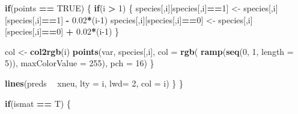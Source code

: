 \documentclass[]{article}
\newenvironment{Shaded}{\begin{snugshade}}{\end{snugshade}}
\newcommand{\ControlFlowTok}[1]{\textcolor[rgb]{0.13,0.29,0.53}{\textbf{#1}}}
\newcommand{\DataTypeTok}[1]{\textcolor[rgb]{0.13,0.29,0.53}{#1}}
\newcommand{\DecValTok}[1]{\textcolor[rgb]{0.00,0.00,0.81}{#1}}
\newcommand{\FloatTok}[1]{\textcolor[rgb]{0.00,0.00,0.81}{#1}}
\newcommand{\KeywordTok}[1]{\textcolor[rgb]{0.13,0.29,0.53}{\textbf{#1}}}
\newcommand{\NormalTok}[1]{#1}
\newcommand{\OperatorTok}[1]{\textcolor[rgb]{0.81,0.36,0.00}{\textbf{#1}}}
\newcommand{\OtherTok}[1]{\textcolor[rgb]{0.56,0.35,0.01}{#1}}
\newcommand{\StringTok}[1]{\textcolor[rgb]{0.31,0.60,0.02}{#1}}
\begin{document}
\begin{Shaded}
\begin{Highlighting}[]
        \ControlFlowTok{if}\NormalTok{(points }\OperatorTok{==}\StringTok{ }\OtherTok{TRUE}\NormalTok{) \{}
          \ControlFlowTok{if}\NormalTok{(i }\OperatorTok{>}\StringTok{ }\DecValTok{1}\NormalTok{) \{}
\NormalTok{            species[,i][species[,i]}\OperatorTok{==}\DecValTok{1}\NormalTok{] <-}\StringTok{ }\NormalTok{species[,i][species[,i]}\OperatorTok{==}\DecValTok{1}\NormalTok{] }\OperatorTok{-}\StringTok{ }\FloatTok{0.02}\OperatorTok{*}\NormalTok{(i}\DecValTok{-1}\NormalTok{)}
\NormalTok{            species[,i][species[,i]}\OperatorTok{==}\DecValTok{0}\NormalTok{] <-}\StringTok{ }\NormalTok{species[,i][species[,i]}\OperatorTok{==}\DecValTok{0}\NormalTok{] }\OperatorTok{+}\StringTok{ }\FloatTok{0.02}\OperatorTok{*}\NormalTok{(i}\DecValTok{-1}\NormalTok{)}
\NormalTok{          \}}
          
\NormalTok{          col <-}\StringTok{ }\KeywordTok{col2rgb}\NormalTok{(i)}
          \KeywordTok{points}\NormalTok{(var, species[,i],}
                 \DataTypeTok{col =} \KeywordTok{rgb}\NormalTok{( }\KeywordTok{ramp}\NormalTok{(}\KeywordTok{seq}\NormalTok{(}\DecValTok{0}\NormalTok{, }\DecValTok{1}\NormalTok{, }\DataTypeTok{length =} \DecValTok{5}\NormalTok{)), }\DataTypeTok{maxColorValue =} \DecValTok{255}\NormalTok{),}
                 \DataTypeTok{pch =} \DecValTok{16}\NormalTok{)}
\NormalTok{        \}}
        
        \KeywordTok{lines}\NormalTok{(preds }\OperatorTok{~}\StringTok{ }\NormalTok{xneu, }\DataTypeTok{lty =}\NormalTok{ i, }\DataTypeTok{lwd=} \DecValTok{2}\NormalTok{, }\DataTypeTok{col =}\NormalTok{ i)}
\NormalTok{      \}}
\NormalTok{    \}}
    
    \ControlFlowTok{if}\NormalTok{(ismat }\OperatorTok{==}\StringTok{ }\NormalTok{T) \{}
      

\end{Highlighting}
\end{Shaded}
\end{document}
